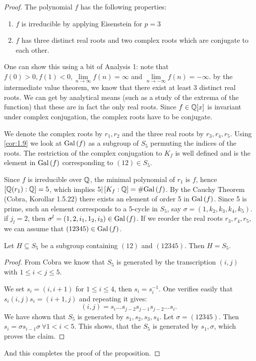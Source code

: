 \documentclass[twoside = false,	%
		headsepline,		%
		parskip = true,
		]{scrbook}						%
\begin{document}
        \begin{proof}
            The polynomial $f$ has the following properties:
            \begin{enumerate}
                \item $f$ is irreducible by applying Eisenstein for $p=3$
                \item $f$ has three distinct real roots and two complex roots which are conjugate to each other.
            \end{enumerate}
            One can show this using a bit of Analysis 1: note that $f(0)>0, f(1)<0, \lim\limits_{n\to\infty}f(n)=\infty$ and $\lim\limits_{n\to-\infty}f(n) = -\infty$.
            by the intermediate value theorem, we know that there exist at least 3 distinct real roots.
            We can get by analytical means (such as a study of the extrema of the function) that these are in fact the only real roots. Since $f\in\mathbb Q[x]$ is invariant under complex conjugation, the complex roots have to be conjugate.
            
            We denote the complex roots by $r_1, r_2$ and the three real roots by $r_3, r_4, r_5$. Using \ref{cor:1.9} we look at $\mathrm{Gal}\left( f\right)$ as a subgroup of $S_5$ permuting the indices of the roots. The restriction of the complex conjugation to $K_f$ is well defined and is the element in $\mathrm{Gal}\left( f\right)$ corresponding to $(12)\in S_5$.
            
            Since $f$ is irreducible over $\mathbb Q$, the minimal polynomial of $r_1$ is $f$, hence $\left[ \mathbb Q(r_1):\mathbb Q\right]=5$, which implies $5| \left[ K_f:\mathbb Q\right] = \#\mathrm{Gal}\left( f\right)$. By the Cauchy Theorem (Cobra, Korollar 1.5.22) there exists an element of order 5 in $\mathrm{Gal}\left( f\right)$. Since 5 is prime, such an element corresponds to a 5-cycle in $S_5$, say $\sigma=(1,k_2,k_3,k_4,k_5)$. if $j_l=2$, then $\sigma^l=(1,2,i_1,1_2,i_3)\in\mathrm{Gal}\left( f\right)$. If we reorder the real roots $r_3, r_4, r_5$, we can assume that $(12345)\in\mathrm{Gal}\left( f\right)$.
            
            \begin{claim*}{}
                Let $H\subseteq S_5$ be a subgroup containing $(12)$ and $(12345)$. Then $H=S_5$.
            \end{claim*}
            \begin{proof}
                From Cobra we know that $S_5$ is generated by the transcription $(i,j)$ with $1\leq i < j \leq 5$.
                
                We set $s_i=(i,i+1)$ for $1\leq i \leq 4$, then $s_i=s_i^{-1}$. One verifies easily that $s_i(i,j)s_i=(i+1,j)$ and repeating it gives:
                $$(i,j)=s_i\dots s_{j-2}s_{j-1}s_{j-2}\dots s_i.$$
                We have shown that $S_5$ is generated by $s_1,s_2,s_3,s_4$. Let $\sigma=(12345)$. Then $s_i=\sigma s_{i-1} \sigma \ \forall 1<i<5$. This shows, that the $S_5$ is generated by $s_1,\sigma$, which proves the claim.
            \end{proof}
            And this completes the proof of the proposition.
        \end{proof}
\end{document}

